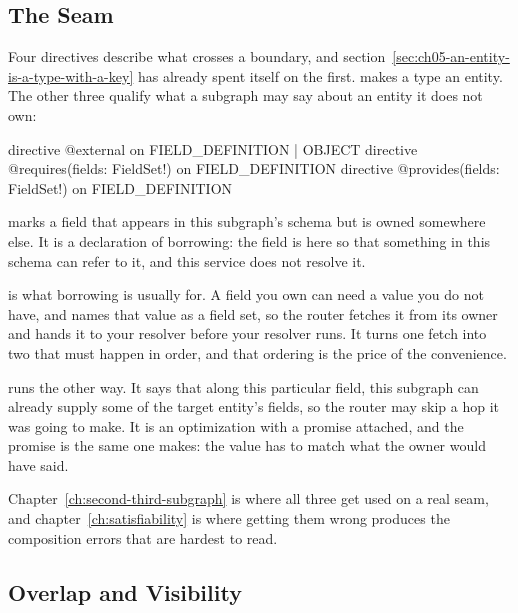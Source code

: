 \subsection{The Seam}

%
Four directives describe what crosses a boundary, and
section~\ref{sec:ch05-an-entity-is-a-type-with-a-key} has already spent itself
on the first.  makes a type an entity. The other three qualify what
a subgraph may say about an entity it does not own:

\begin{graphqlsdl}
directive @external on FIELD_DEFINITION | OBJECT
directive @requires(fields: FieldSet!) on FIELD_DEFINITION
directive @provides(fields: FieldSet!) on FIELD_DEFINITION
\end{graphqlsdl}

%
 marks a field that appears in this subgraph's schema but is
owned somewhere else. It is a declaration of borrowing: the field is here so
that something in this schema can refer to it, and this service does not
resolve it.

%
 is what borrowing is usually for. A field you own can need a
value you do not have, and  names that value as a field set, so
the router fetches it from its owner and hands it to your resolver before your
resolver runs. It turns one fetch into two that must happen in order, and that
ordering is the price of the convenience.

%
 runs the other way. It says that along this particular field,
this subgraph can already supply some of the target entity's fields, so the
router may skip a hop it was going to make. It is an optimization with a
promise attached, and the promise is the same one  makes: the
value has to match what the owner would have said.

Chapter~\ref{ch:second-third-subgraph} is where all three get used on a real
seam, and chapter~\ref{ch:satisfiability} is where getting them wrong produces
the composition errors that are hardest to read.

\subsection{Overlap and Visibility}

